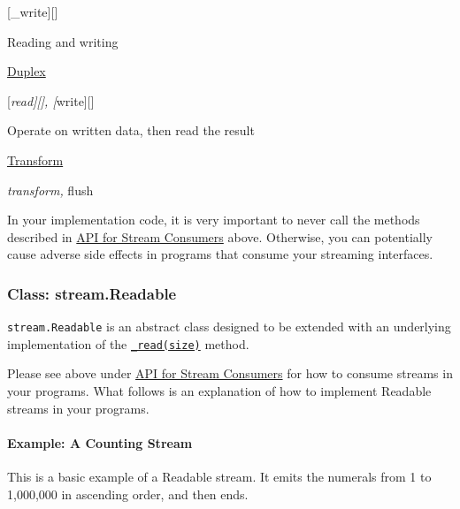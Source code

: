 {[}\_write{]}{[}{]}

Reading and writing

\hyperref[stream\_class\_stream\_duplex\_1]{Duplex}

{[}\emph{read{]}{[}{]}, {[}}write{]}{[}{]}

Operate on written data, then read the result

\hyperref[stream\_class\_stream\_transform\_1]{Transform}

\emph{transform, }flush

In your implementation code, it is very important to never call the
methods described in \hyperref[stream\_api\_for\_stream\_consumers]{API
for Stream Consumers} above. Otherwise, you can potentially cause
adverse side effects in programs that consume your streaming interfaces.

\subsubsection{Class: stream.Readable}

\texttt{stream.Readable} is an abstract class designed to be extended
with an underlying implementation of the
\hyperref[stream\_readable\_read\_size\_1]{\texttt{\_read(size)}}
method.

Please see above under
\hyperref[stream\_api\_for\_stream\_consumers]{API for Stream Consumers}
for how to consume streams in your programs. What follows is an
explanation of how to implement Readable streams in your programs.

\paragraph{Example: A Counting Stream}

This is a basic example of a Readable stream. It emits the numerals from
1 to 1,000,000 in ascending order, and then ends.

